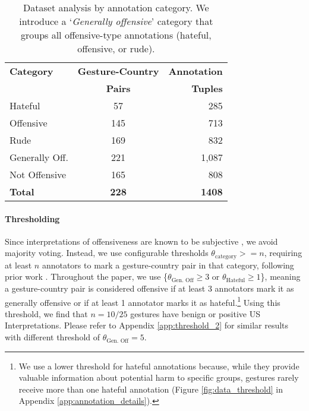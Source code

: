 \begin{table}[h]
\centering
\small
\begin{tabular}{@{}lcr@{}}
\toprule
\textbf{Category} & \textbf{Gesture-Country} & \textbf{Annotation} \\
\textbf{} & \textbf{Pairs} & \textbf{Tuples} \\
\midrule
Hateful & 57 & 285 \\
Offensive & 145 & 713 \\
Rude & 169 & 832 \\
Generally Off. & 221 & 1,087 \\
Not Offensive & 165 & 808 \\
\midrule
\textbf{Total} & \textbf{228} & \textbf{1408}  \\
\bottomrule
\end{tabular}
\caption{Dataset analysis by annotation category. We introduce a `\textit{Generally offensive}' category that groups all offensive-type annotations (hateful, offensive, or rude).}
\label{tab:gesture_summary}
\vspace{-1.5em}
\end{table}



\paragraph{Thresholding} 
Since interpretations of offensiveness are known to be subjective \cite{prabhakaran2021releasing, sap2022annotators, ross2017measuring}, we avoid majority voting. Instead, we use configurable thresholds $\theta_\text{category}>=n$, requiring at least $n$ annotators to mark a gesture-country pair in that category, following prior work \citep{bhatt2022re,jha2023seegull}.  Throughout the paper, we use \{$\theta_\text{Gen. Off}\geq3$ or $\theta_\text{Hateful}\geq1$\}, meaning a gesture-country pair is considered offensive if at least 3 annotators mark it as generally offensive or if at least 1 annotator marks it as hateful.\footnote{We use a lower threshold for hateful annotations because, while they provide valuable information about potential harm to specific groups, gestures rarely receive more than one hateful annotation (Figure \ref{fig:data_threshold} in Appendix \ref{app:annotation_details}).} Using this threshold, we find that $n=10/25$ gestures have benign or positive US Interpretations. 
Please refer to Appendix \ref{app:threshold_2} for similar results with different threshold of $\theta_\text{Gen. Off}=5$. 
